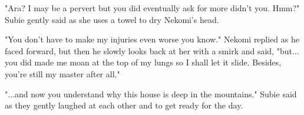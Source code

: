 "Ara? I may be a pervert but you did eventually ask for more didn't you. Hmm?" Subie gently said as she uses a towel to dry Nekomi's head. 

"You don't have to make my injuries even worse you know." Nekomi replied as he faced forward, but then he slowly looks back at her with a smirk and said, "but... you did made me moan at the top of my lungs so I shall let it slide. Besides, you're still my master after all."

"...and now you understand why this house is deep in the mountains." Subie said as they gently laughed at each other and to get ready for the day. 
